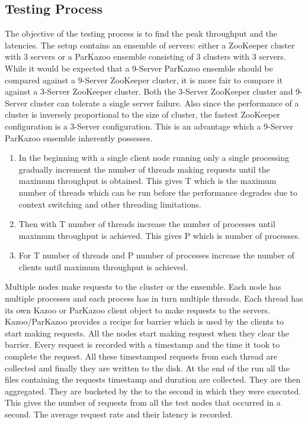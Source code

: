 \subsection{Testing Process}
The objective of the testing process is to find the peak throughput and the latencies. The setup contains an ensemble of servers: either a ZooKeeper cluster with 3 servers or a ParKazoo ensemble consisting of 3 clusters with 3 servers. While it would be expected that a 9-Server ParKazoo ensemble should be compared against a 9-Server ZooKeeper cluster, it is more fair to compare it against a 3-Server ZooKeeper cluster. Both the 3-Server ZooKeeper cluster and 9-Server cluster can tolerate a single server failure. Also since the performance of a cluster is inversely proportional to the size of cluster, the fastest ZooKeeper configuration is a 3-Server configuration. This is an advantage which a 9-Server ParKazoo ensemble inherently possesses.

\begin{enumerate}
  \item In the beginning with a single client node running only a single processing gradually increment the number of threads making requests until the maximum throughput is obtained. This gives T which is the maximum number of threads which can be run before the performance degrades due to context switching and other threading limitations.
  \item Then with T number of threads increase the number of processes until maximum throughput is achieved. This gives P which is number of processes.
  \item For T number of threads and P number of processes increase the number of clients until maximum throughput is achieved.
\end{enumerate}
















Multiple nodes make requests to the cluster or the ensemble. Each node has multiple processes and each process has in turn multiple threads. Each thread has its own Kazoo or ParKazoo client object to make requests to the servers.
Kazoo/ParKazoo provides a recipe for barrier which is used by the clients to start making requests. All the nodes start making request when they clear the barrier. Every request is recorded with a timestamp and the time it took to complete the request. All these timestamped requests from each thread are collected and finally they are written to the disk. At the end of the run all the files containing the requests timestamp and duration are collected. They are then aggregated. They are bucketed by the to the second in which they were executed. This gives the number of requests from all the test nodes that occurred in a second. The average request rate and their latency is recorded. 

